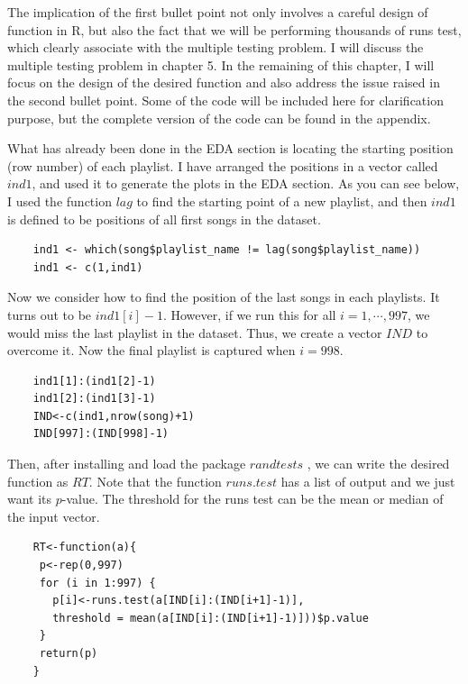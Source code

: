 \documentclass[12pt]{article}
\theoremstyle{plain}
\theoremstyle{definition}
\theoremstyle{remark}
\begin{document}
The implication of the first bullet point not only involves a careful design of function in R, but also the fact that we will be performing thousands of runs test, which clearly associate with the multiple testing problem. I will discuss the multiple testing problem in chapter 5. In the remaining of this chapter, I will focus on the design of the desired function and also address the issue raised in the second bullet point. Some of the code will be included here for clarification purpose, but the complete version of the code can be found in the appendix.

What has already been done in the EDA section is locating the starting position (row number) of each playlist. I have arranged the positions in a vector called $ind1$, and used it to generate the plots in the EDA section. As you can see below, I used the function $lag$ to find the starting point of a new playlist, and then $ind1$ is defined to be positions of all first songs in the dataset.
\begin{verbatim}
    ind1 <- which(song$playlist_name != lag(song$playlist_name))
    ind1 <- c(1,ind1)
\end{verbatim}
Now we consider how to find the position of the last songs in each playlists. It turns out to be $ind1[i]-1$. However, if we run this for all $i=1, \cdots, 997$, we would miss the last playlist in the dataset. Thus, we create a vector $IND$ to overcome it. Now the final playlist is captured when $i=998$. 
\begin{verbatim}
    ind1[1]:(ind1[2]-1)
    ind1[2]:(ind1[3]-1)
    IND<-c(ind1,nrow(song)+1)
    IND[997]:(IND[998]-1)
\end{verbatim}
Then, after installing and load the package $randtests$ \cite{3.7}, we can write the desired function as $RT$. Note that the function $runs.test$ has a list of output and we just want its $p$-value. The threshold for the runs test can be the mean or median of the input vector.
\begin{verbatim}
    RT<-function(a){
     p<-rep(0,997)
     for (i in 1:997) {
       p[i]<-runs.test(a[IND[i]:(IND[i+1]-1)],
       threshold = mean(a[IND[i]:(IND[i+1]-1)]))$p.value
     }
     return(p)
    }
\end{verbatim}
\end{document}
